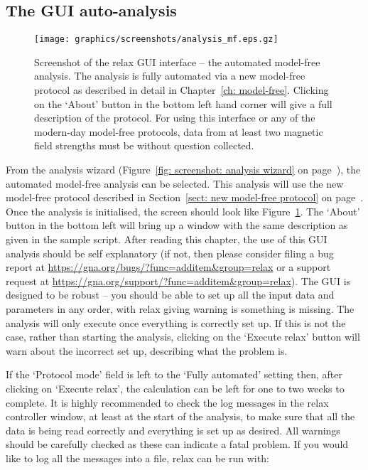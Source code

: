 \begin{htmlonly}
\begin{htmlonly}

\section{The GUI auto-analysis}

\begin{figure}
\centerline{\texttt{[image: graphics/screenshots/analysis\_mf.eps.gz]}}
\caption[GUI screenshot -- Model-free analysis]{Screenshot of the relax GUI interface -- the automated model-free analysis.  The analysis is fully automated via a new model-free protocol as described in detail in Chapter~\ref{ch: model-free}.  Clicking on the `About' button in the bottom left hand corner will give a full description of the protocol.  For using this interface or any of the modern-day model-free protocols, data from at least two magnetic field strengths must be without question collected.}\label{fig: screenshot: model-free analysis}
\end{figure}

From the analysis wizard (Figure~\ref{fig: screenshot: analysis wizard} on page~\pageref{fig: screenshot: analysis wizard}), the automated model-free analysis can be selected.  This analysis will use the new model-free protocol described in Section~\ref{sect: new model-free protocol} on page~\pageref{sect: new model-free protocol}.  Once the analysis is initialised, the screen should look like Figure~\ref{fig: screenshot: model-free analysis}.  The `About' button in the bottom left will bring up a window with the same description as given in the sample script.  After reading this chapter, the use of this GUI analysis should be self explanatory (if not, then please consider filing a bug report at \href{https://gna.org/bugs/?func=additem\&group=relax}{https://gna.org/bugs/?func=additem\&group=relax} or a support request at \href{https://gna.org/support/?func=additem\&group=relax}{https://gna.org/support/?func=additem\&group=relax}).  The GUI is designed to be robust -- you should be able to set up all the input data and parameters in any order, with relax giving warning is something is missing.  The analysis will only execute once everything is correctly set up.  If this is not the case, rather than starting the analysis, clicking on the `Execute relax' button will warn about the incorrect set up, describing what the problem is.

If the `Protocol mode' field is left to the `Fully automated' setting then, after clicking on `Execute relax', the calculation can be left for one to two weeks to complete.  It is highly recommended to check the log messages in the relax controller window, at least at the start of the analysis, to make sure that all the data is being read correctly and everything is set up as desired.  All warnings should be carefully checked as these can indicate a fatal problem.  If you would like to log all the messages into a file, relax can be run with:


\end{htmlonly}
\end{htmlonly}

